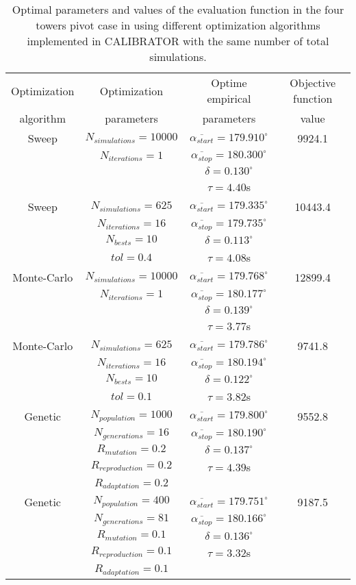 \documentclass[review,authoryear]{elsarticle}
\newcommand{\TABLE}[5]
{
	\begin{table}[ht!]
		\centering
		\caption{#4.\label{#5}}
		#1
		\begin{tabular}{#2}
			#3
		\end{tabular}
	\end{table}
}
\begin{document}
\TABLE{\scriptsize}{cccc}
{
	Optimization & Optimization & Optime empirical & Objective function
	\\ algorithm & parameters & parameters & value
	\\ \hline
	Sweep & $N_{simulations}=10000$ & $\overline{\alpha_{start}}=179.910^\circ$
	& 9924.1
	\\ & $N_{iterations}=1$ & $\overline{\alpha_{stop}}=180.300^\circ$
	\\ & & $\delta=0.130^\circ$
	\\ & & $\tau=4.40$s
	\\ \hline
	Sweep & $N_{simulations}=625$ & $\overline{\alpha_{start}}=179.335^\circ$
	& 10443.4
	\\ & $N_{iterations}=16$ & $\overline{\alpha_{stop}}=179.735^\circ$
	\\ & $N_{bests}=10$ & $\delta=0.113^\circ$
	\\ & $tol=0.4$ & $\tau=4.08$s
	\\ \hline
	Monte-Carlo & $N_{simulations}=10000$
	& $\overline{\alpha_{start}}=179.768^\circ$ & 12899.4
	\\ & $N_{iterations}=1$ & $\overline{\alpha_{stop}}=180.177^\circ$
	\\ & & $\delta=0.139^\circ$
	\\ & & $\tau=3.77$s
	\\ \hline
	Monte-Carlo & $N_{simulations}=625$
	& $\overline{\alpha_{start}}=179.786^\circ$ & 9741.8
	\\ & $N_{iterations}=16$ & $\overline{\alpha_{stop}}=180.194^\circ$
	\\ & $N_{bests}=10$ & $\delta=0.122^\circ$
	\\ & $tol=0.1$ & $\tau=3.82$s
	\\ \hline
	Genetic & $N_{population}=1000$ & $\overline{\alpha_{start}}=179.800^\circ$
	& 9552.8
	\\ & $N_{generations}=16$ & $\overline{\alpha_{stop}}=180.190^\circ$
	\\ & $R_{mutation}=0.2$ & $\delta=0.137^\circ$
	\\ & $R_{reproduction}=0.2$ & $\tau=4.39$s
	\\ & $R_{adaptation}=0.2$
	\\ \hline
	Genetic & $N_{population}=400$ & $\overline{\alpha_{start}}=179.751^\circ$
	& 9187.5
	\\ & $N_{generations}=81$ & $\overline{\alpha_{stop}}=180.166^\circ$
	\\ & $R_{mutation}=0.1$ & $\delta=0.136^\circ$
	\\ & $R_{reproduction}=0.1$ & $\tau=3.32$s
	\\ & $R_{adaptation}=0.1$
	\\ \hline
}{Optimal parameters and values of the evaluation function in the four towers pivot case in \citet{Ouazaa15} using different optimization algorithms implemented in CALIBRATOR with the same number of total simulations}{TabPivot}
\end{document}
